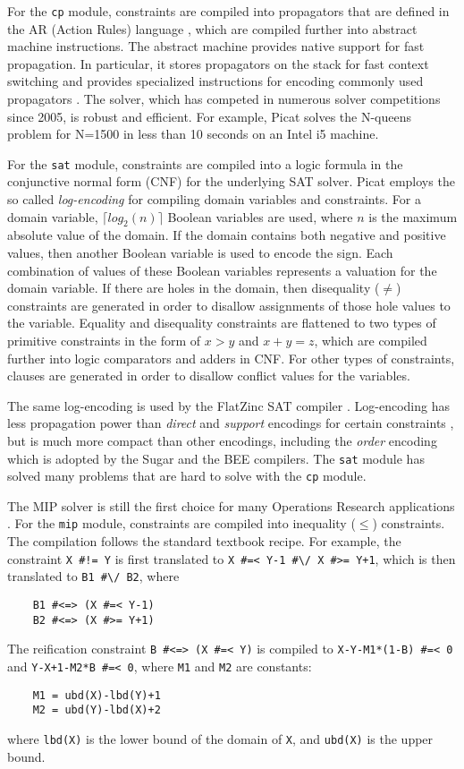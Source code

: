 \documentclass{new_tlp}
\begin{document}
For the {\tt cp} module, constraints are compiled into propagators that are defined in the AR (Action Rules) language \cite{zhou06ar}, which are compiled further into abstract machine instructions. The abstract machine provides native support for fast propagation. In particular, it stores propagators on the stack for fast context switching and provides specialized instructions for encoding commonly used propagators \cite{zhou06ar}. The solver, which has competed in numerous solver competitions since 2005, is robust and efficient. For example, Picat solves the N-queens problem for N=1500 in less than 10 seconds on an Intel i5 machine.

For the {\tt sat} module, constraints are compiled into a logic formula in the conjunctive normal form (CNF) for the underlying SAT solver. Picat employs the so called {\it log-encoding} for compiling domain variables and constraints. For a domain variable,  $\lceil log_2(n)\rceil$ Boolean variables are used, where $n$ is the maximum absolute value of the domain. If the domain contains both negative and positive values, then another Boolean variable is used to encode the sign. Each combination of values of these Boolean variables represents a valuation for the domain variable. If there are holes in the domain, then disequality ($\neq$) constraints are generated in order to disallow assignments of those hole values to the variable. Equality and disequality constraints are flattened to two types of primitive constraints in the form of $x>y$ and $x+y=z$, which are compiled further into logic comparators and adders in CNF. For other types of constraints, clauses are generated in order to disallow conflict values for the variables. 

The same log-encoding is used by the FlatZinc SAT compiler \cite{Huang08}. Log-encoding has less propagation power than {\it direct} and {\it support} encodings for certain constraints \cite{Gavanelli07}, but is much more compact than other encodings, including the {\it order} encoding which is adopted by the Sugar \cite{TamuraTKB09} and the BEE \cite{MetodiC12} compilers. The {\tt sat} module has solved many problems that are hard to solve with the {\tt cp} module.

The MIP solver is still the first choice for many Operations Research applications \cite{Appa10}. For the {\tt mip} module, constraints are compiled into inequality ($\le$) constraints. The compilation follows the standard textbook recipe. For example, the constraint \verb+X #!= Y+ is first translated to \verb&X #=< Y-1 #\/ X #>= Y+1&, which is then translated to \verb&B1 #\/ B2&, where 
\begin{verbatim}
    B1 #<=> (X #=< Y-1)
    B2 #<=> (X #>= Y+1)
\end{verbatim}
The reification constraint \verb&B #<=> (X #=< Y)& is compiled to \verb&X-Y-M1*(1-B) #=< 0& and \verb&Y-X+1-M2*B #=< 0&, where {\tt M1} and {\tt M2} are constants:
\begin{verbatim}
    M1 = ubd(X)-lbd(Y)+1
    M2 = ubd(Y)-lbd(X)+2
\end{verbatim}
where {\tt lbd(X)} is the lower bound of the domain of {\tt X}, and {\tt ubd(X)} is the upper bound.
\end{document}
